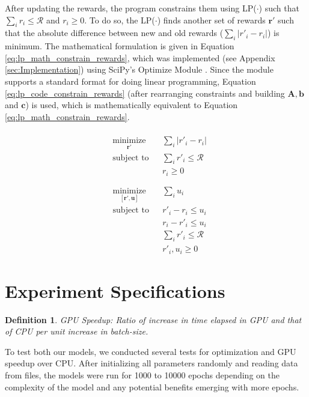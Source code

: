 \documentclass[12pt]{article}
\newtheorem{mydef}{Definition}
\newcommand{\vect}[1]{\mathbf{#1}}  %
\newcommand{\matr}[1]{\mathbf{#1}}  %
\begin{document}
    After updating the rewards, the program constrains them using LP($\cdot$) such that $\sum_{i}r_i \leq \mathcal{R}$ and $r_i \geq 0$. To do so, the LP($\cdot$) finds another set of rewards $\vect{r'}$ such that the absolute difference between new and old rewards ($\sum_{i}|r'_i - r_i|$) is minimum. The mathematical formulation is given in Equation \ref{eq:lp_math_constrain_rewards}, which was implemented (see Appendix \ref{sec:Implementation}) using SciPy's Optimize Module \cite{SCPOptimizeDocs}. Since the module supports a standard format for doing linear programming, Equation \ref{eq:lp_code_constrain_rewards} (after rearranging constraints and building $\matr{A}, \vect{b}$ and $\vect{c}$) is used, which is mathematically equivalent to Equation \ref{eq:lp_math_constrain_rewards}.
    \begin{multicols}{2}
        \begin{equation} \label{eq:lp_math_constrain_rewards}
            \begin{aligned}\\
                & \underset{\vect{r'}}{\text{minimize}}
                & & \sum_{i}|r'_i - r_i|\\
                & \text{subject to}
                & & \sum_{i}r'_i \leq \mathcal{R}\\
                &&& r_i \geq 0\\ \\
            \end{aligned}
        \end{equation}\break
        \begin{equation} \label{eq:lp_code_constrain_rewards}
            \begin{aligned}
                & \underset{[\vect{r'}, \vect{u}]}{\text{minimize}}
                & & \sum_{i} u_i\\
                & \text{subject to}
                & & r'_i - r_i \leq u_i\\
                &&& r_i - r'_i \leq u_i\\
                &&& \sum_{i} r'_i \leq \mathcal{R}\\
                &&& r'_i, u_i \geq 0
            \end{aligned}
        \end{equation}
    \end{multicols}
    
    \section{Experiment Specifications} \label{sec:Experiment Specifications}
    \begin{mydef} \label{def:GPU Speedup}
        GPU Speedup: Ratio of increase in time elapsed in GPU and that of CPU per unit increase in batch-size.
    \end{mydef}
    To test both our models, we conducted several tests for optimization and GPU speedup over CPU. After initializing all parameters randomly and reading data from files, the models were run for 1000 to 10000 epochs depending on the complexity of the model and any potential benefits emerging with more epochs.
    
\end{document}

